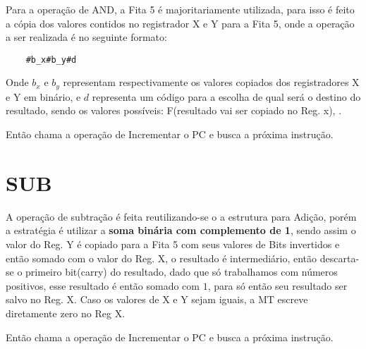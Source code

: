 \documentclass[a4paper,12pt]{article}
\begin{document}
Para a operação de AND, a Fita 5 é majoritariamente utilizada, para isso é feito a cópia dos valores contidos no registrador X e Y para a Fita 5, onde a operação a ser realizada é no seguinte formato:
\begin{verbatim}
    #b_x#b_y#d
\end{verbatim}
Onde $b_x$ e $b_y$ representam respectivamente os valores copiados dos registradores X e Y em binário, e $d$ representa um código para a escolha de qual será o destino do resultado, sendo os valores possíveis: F(resultado vai ser copiado no Reg. x), .

Então chama a operação de Incrementar o PC e busca a próxima instrução.

\section*{SUB}

A operação de subtração é feita reutilizando-se o a estrutura para Adição, porém a estratégia é utilizar a \textbf{soma binária com complemento de 1}, sendo assim o valor do Reg. Y é copiado para a Fita 5 com seus valores de Bits invertidos e então somado com o valor do Reg. X, o resultado é intermediário, então descarta-se o primeiro bit(carry) do resultado, dado que só trabalhamos com números positivos, esse resultado é então somado com $1$, para só então seu resultado ser salvo no Reg. X. Caso os valores de X e Y sejam iguais, a MT escreve diretamente zero no Reg X.

Então chama a operação de Incrementar o PC e busca a próxima instrução.
\end{document}
